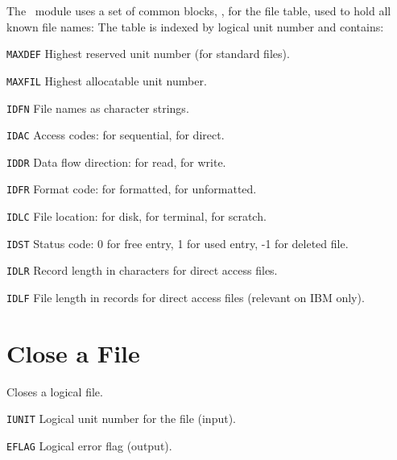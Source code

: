 The ~module uses a set of common blocks, ,
for the file table, used to hold all known file names:
The table is indexed by logical unit number and contains:
\begin{mylist}
\item[\tt MAXDEF]
Highest reserved unit number (for standard files).
\item[\tt MAXFIL]
Highest allocatable unit number.
\item[\tt IDFN]
File names as character strings.
\item[\tt IDAC]
Access codes:  for sequential,  for direct.
\item[\tt IDDR]
Data flow direction:  for read,  for write.
\item[\tt IDFR]
Format code:  for formatted,  for unformatted.
\item[\tt IDLC]
File location:  for disk,  for terminal,
 for scratch.
\item[\tt IDST]
Status code: 0 for free entry, 1 for used entry, -1 for deleted file.
\item[\tt IDLR]
Record length in characters for direct access files.
\item[\tt IDLF]
File length in records for direct access files (relevant on IBM only).
\end{mylist}

\section{Close a File}
\label{FLCLOS}
Closes a logical file.
\begin{mylist}
\item[\tt IUNIT]
Logical unit number for the file (input).
\item[\tt EFLAG]
Logical error flag (output).
\end{mylist}

